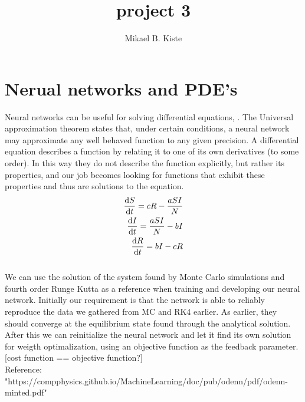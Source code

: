 \documentclass{report}
\author{Mikael B. Kiste}
\title{project 3}
\begin{document}
	\section{Nerual networks and PDE's}
	Neural networks can be useful for solving differential equations, . The Universal approximation theorem states that, under certain conditions, a neural network may approximate any well behaved function to any given precision. A differential equation describes a function by relating it to one of its own derivatives (to some order). In this way they do not describe the function explicitly, but rather its properties, and our job becomes looking for functions that exhibit these properties and thus are solutions to the equation.\\
	\begin{align*}
		\dv{S}{t} = cR -\frac{aSI}{N}\\
		\dv{I}{t} = \frac{aSI}{N}-bI\\
		\dv{R}{t} = bI - cR
	\end{align*}
	\\We can use the solution of the system found by Monte Carlo simulations and fourth order Runge Kutta as a reference when training and developing our neural network. Initially our requirement is that the network is able to reliably reproduce the data we gathered from MC and RK4 earlier. As earlier, they should converge at the equilibrium state found through the analytical solution. After this we can reinitialize the neural network and let it find its own solution for weigth optimalization, using an objective function as the feedback parameter. [cost function == objective function?]
	\\Reference: "https://compphysics.github.io/MachineLearning/doc/pub/odenn/pdf/odenn-minted.pdf"
\end{document}
